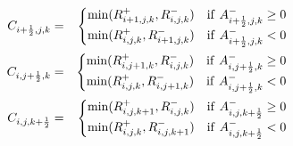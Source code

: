 \begin{enumerate}
\begin{eqnarray}
C_{i+\frac{1}{2},j,k} &=& 
\begin{cases}
        \min( R_{i+1,j,k}^{+}, R_{i,j,k}^{-} ) & {\rm if~} A_{i+\frac{1}{2},j,k}^{-}\geq 0\\
        \min( R_{i,j,k}^{+}, R_{i+1,j,k}^{-} ) & {\rm if~} A_{i+\frac{1}{2},j,k}^{-}<0\\
\end{cases}
\\
C_{i,j+\frac{1}{2},k} &=& 
\begin{cases}
        \min( R_{i,j+1,k}^{+}, R_{i,j,k}^{-} ) & {\rm if~} A_{i,j+\frac{1}{2},k}^{-}\geq 0\\
        \min( R_{i,j,k}^{+}, R_{i,j+1,k}^{-} ) & {\rm if~} A_{i,j+\frac{1}{2},k}^{-}<0\\
\end{cases}
\\
C_{i,j,k+\frac{1}{2}} &=& 
\begin{cases}
        \min( R_{i,j,k+1}^{+}, R_{i,j,k}^{-} ) & {\rm if~} A_{i,j,k+\frac{1}{2}}^{-}\geq 0\\
        \min( R_{i,j,k}^{+}, R_{i,j,k+1}^{-} ) & {\rm if~} A_{i,j,k+\frac{1}{2}}^{-}<0\\
\end{cases}
\end{eqnarray}
\end{enumerate}
